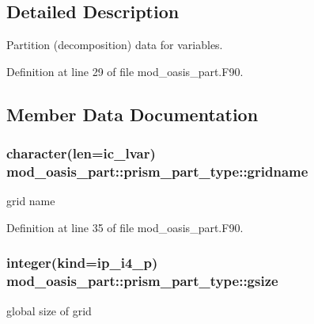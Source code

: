 \subsection{Detailed Description}
Partition (decomposition) data for variables. 

Definition at line 29 of file mod\+\_\+oasis\+\_\+part.\+F90.



\subsection{Member Data Documentation}
\hypertarget{structmod__oasis__part_1_1prism__part__type_a4507d4efc53b93149a44bf44d12c9e56}{
\subsubsection[{gridname}]{\setlength{\rightskip}{0pt plus 5cm}character(len=ic\+\_\+lvar) mod\+\_\+oasis\+\_\+part\+::prism\+\_\+part\+\_\+type\+::gridname\hspace{0.3cm}{\ttfamily [private]}}}\label{structmod__oasis__part_1_1prism__part__type_a4507d4efc53b93149a44bf44d12c9e56}


grid name 



Definition at line 35 of file mod\+\_\+oasis\+\_\+part.\+F90.

\hypertarget{structmod__oasis__part_1_1prism__part__type_aaa2c19e53815eaf5df431612eadabfa4}{
\subsubsection[{gsize}]{\setlength{\rightskip}{0pt plus 5cm}integer(kind=ip\+\_\+i4\+\_\+p) mod\+\_\+oasis\+\_\+part\+::prism\+\_\+part\+\_\+type\+::gsize\hspace{0.3cm}{\ttfamily [private]}}}\label{structmod__oasis__part_1_1prism__part__type_aaa2c19e53815eaf5df431612eadabfa4}


global size of grid 



